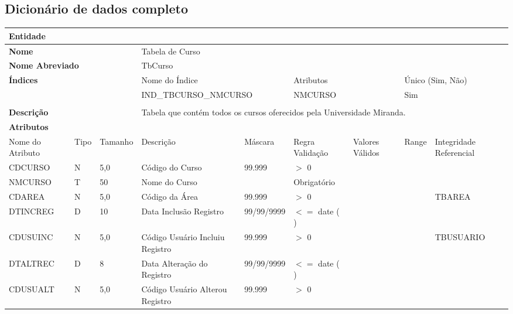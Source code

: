 \subsection{\textbf{Dicionário de dados completo}}

\noindent {}

\begin{longtable}{|p{3.5cm}|p{1cm}|p{2cm}|p{6cm}|p{2cm}|p{2cm}|p{2cm}|p{2cm}|p{2.5cm}|}
\hline 
\multicolumn{3}{|l|}{ \cellcolor{lightgray} \textbf{Entidade}} & \multicolumn{6}{c|}{ \cellcolor{lightgray}} \\ \hline
\multicolumn{3}{|l|}{\textbf{Nome}} & \multicolumn{6}{l|}{Tabela de Curso} \\ \hline
\multicolumn{3}{|l|}{\textbf{Nome Abreviado}} & \multicolumn{6}{l|}{TbCurso} \\ \hline
\multicolumn{3}{|l|}{\textbf{Índices}} & \multicolumn{2}{l|}{Nome do Índice} & \multicolumn{2}{l|}{Atributos} & \multicolumn{2}{l|}{Único (Sim, Não)}\\ \hline
\multicolumn{3}{|l|}{} & \multicolumn{2}{l|}{IND\_TBCURSO\_NMCURSO} & \multicolumn{2}{l|}{NMCURSO} & \multicolumn{2}{l|}{Sim}\\ \hline
\multicolumn{3}{|l|}{} & \multicolumn{2}{l|}{} & \multicolumn{2}{l|}{} & \multicolumn{2}{l|}{}\\ \hline
\multicolumn{3}{|l|}{\textbf{Descrição}} & \multicolumn{6}{l|}{Tabela que contém todos os cursos oferecidos pela Universidade Miranda.}\\ \hline
\multicolumn{9}{|l|}{ \cellcolor{lightgray} \textbf{Atributos}} \\ \hline

\cellcolor{lightgray} {Nome do Atributo} &  \cellcolor{lightgray} {Tipo} &  \cellcolor{lightgray} {Tamanho} &  \cellcolor{lightgray} {Descrição} &  \cellcolor{lightgray} {Máscara} &  \cellcolor{lightgray} {Regra Validação} &  \cellcolor{lightgray} {Valores Válidos} &  \cellcolor{lightgray} {Range} &  \cellcolor{lightgray} {Integridade Referencial} \\ \hline

CDCURSO &  N & 5,0 & Código do Curso & 99.999 & $>$ 0 & & & \\ \hline
NMCURSO &  T & 50 & Nome do Curso & & Obrigatório & & & \\ \hline
CDAREA & N & 5,0 & Código da Área & 99.999 & $>$ 0 & & & TBAREA \\ \hline
DTINCREG & D & 10 & Data Inclusão Registro & 99/99/9999 & $<=$  date ( ) & & & \\ \hline
CDUSUINC &  N & 5,0 &Código Usuário Incluiu Registro & 99.999 & $>$ 0 &
& & TBUSUARIO \\ \hline
DTALTREC & D & 8 & Data Alteração do Registro &  99/99/9999 & $<=$  date ( ) & & & \\ \hline
CDUSUALT &  N &  5,0 & Código Usuário Alterou  Registro & 99.999 & $>$ 0 & & & \\ \hline
\end{longtable}  
